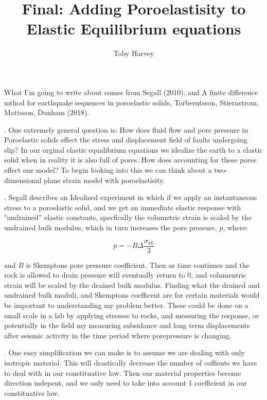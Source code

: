 \documentclass{article}
\begin{document}
\title{Final: Adding Poroelastisity to Elastic Equilibrium equations}
\author{Toby Harvey}
\maketitle

\noindent What I'm going to write about comes from Segall (2010), and A finite difference mthod for earthquake sequences in poroelastic solids, Torberntsson, Stiernstrom, Mattsson, Dunham (2018).

\vspace{3mm}

. One extremely general question is: How does fluid flow and pore pressure in Poroelastic solids effect the stress and displacement field of faults undergoing slip? In our orginal elastic equalibrium equations we idealize the earth to a elastic solid when in reality it is also full of pores. How does accounting for these pores effect our model? To begin looking into this we can think about a two-dimensional plane strain model with poroelastisity.

. Segall describes an Idealized experiment in which if we apply an instantaneous stress to a poroelastic solid, and  we get an immediate elastic response with "undrained'' elastic constants, specfically the volumetric strain is scaled by the undrained bulk modulus, which in turn increases the pore pressure, $p$, where:

$$p = -B \Delta\frac{\sigma_{kk}}{3}$$

and $B$ is Skemptons pore pressure coefficient. Then as time continues and the rock is allowed to drain pressure will eventually return to 0, and volumentric strain will be scaled by the drained bulk modulus. Finding what the drained and undrained bulk moduli, and Skemptons coefficent are for certain materials would be important to understanding my problem better. These could be done on a small scale in a lab by applying stresses to rocks, and messuring the response, or potentially in the field my measuring subsidance and long term displacements after seismic activity in the time period where porepressure is changing.

. One easy simplification we can make is to assume we are dealing with only isotropic material. This will drastically decrease the number of coffients we have to deal with in our constituative law. Then our material properties become direction indepent, and we only need to take into account 1 coefficient in our constituative law.
\end{document}
